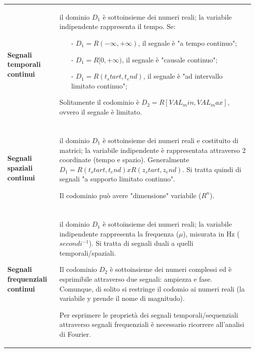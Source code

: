 \documentclass[a4paper, 10pt]{report}
\begin{document}
\begin{longtable}{| p{} | p{} |}
\textbf{Segnali temporali continui} & il dominio $D_1$ è sottoinsieme dei numeri reali; la variabile indipendente rappresenta il tempo. Se:
\begin{itemize}
\item[-] $D_1 = R(-\infty, +\infty)$, il segnale è "a tempo continuo";
\item[-] $D_1 = R[0, +\infty)$, il segnale è "causale continuo";
\item[-] $D_1 = R(t_start, t_end)$, il segnale è "ad intervallo limitato continuo";
\end{itemize}

Solitamente il codominio è $D_2 = R[VAL_min, VAL_max]$, ovvero il segnale è limitato.\\\\

\textbf{Segnali spaziali continui} & il dominio $D_1$ è sottoinsieme dei numeri reali e costituito di matrici; la variabile indipendente è rappresentata attraverso 2 coordinate (tempo e spazio). Generalmente $D_1 = R(t_start, t_end) x R(z_start, z_end)$. Si tratta quindi di segnali "a supporto limitato continuo".

Il codominio può avere "dimensione" variabile ($R^n$).\\\\

\textbf{Segnali frequenziali continui} & il dominio $D_1$ è sottoinsieme dei numeri reali; la variabile indipendente rappresenta la frequenza ($\mu$), misurata in Hz ($secondi^{-1}$). Si tratta di segnali duali a quelli temporali/spaziali.

Il codominio $D_2$ è sottoinsieme dei numeri complessi ed è esprimibile attraverso due segnali: ampiezza e fase. Comunque, di solito si restringe il codomio ai numeri reali (la variabile y prende il nome di magnitudo). 

Per esprimere le proprietà dei segnali temporali/sequenziali attraverso segnali frequenziali è necessario ricorrere all'analisi di Fourier.


\end{longtable}
\end{document}
